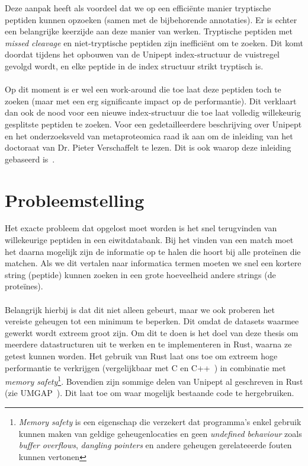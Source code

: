 \documentclass[11pt,dutch,faculty=we,layout=titlefont,underline=false,titleUppercase=true,titleUnderline=true]{ugent2016-report}
\begin{document}
    Deze aanpak heeft als voordeel dat we op een efficiënte manier tryptische peptiden kunnen opzoeken (samen met de bijbehorende annotaties).
    Er is echter een belangrijke keerzijde aan deze manier van werken.
    Tryptische peptiden met \textit{missed cleavage} en niet-tryptische peptiden zijn inefficiënt om te zoeken.
    Dit komt doordat tijdens het opbouwen van de Unipept index-structuur de vuistregel gevolgd wordt, en elke peptide in de index structuur strikt tryptisch is.
    \\ \\
    Op dit moment is er wel een work-around die toe laat deze peptiden toch te zoeken (maar met een erg significante impact op de performantie).
    Dit verklaart dan ook de nood voor een nieuwe index-structuur die toe laat volledig willekeurig gesplitste peptiden te zoeken.
    \newline
    Voor een gedetailleerdere beschrijving over Unipept en het onderzoeksveld van metaproteomica raad ik aan om de inleiding van het doctoraat van Dr. Pieter Verschaffelt te lezen.
    Dit is ook waarop deze inleiding gebaseerd is~\cite{phdPieterUnipept}.


    \section{Probleemstelling}\label{sec:probleemstelling}
    Het exacte probleem dat opgelost moet worden is het snel terugvinden van willekeurige peptiden in een eiwitdatabank.
    Bij het vinden van een match moet het daarna mogelijk zijn de informatie op te halen die hoort bij alle proteïnen die matchen.
    Als we dit vertalen naar informatica termen moeten we snel een kortere string (peptide) kunnen zoeken in een grote hoeveelheid andere strings (de proteïnes).
    \\ \\
    Belangrijk hierbij is dat dit niet alleen gebeurt, maar we ook proberen het vereiste geheugen tot een minimum te beperken.
    Dit omdat de datasets waarmee gewerkt wordt extreem groot zijn.
    Om dit te doen is het doel van deze thesis om meerdere datastructuren uit te werken en te implementeren in Rust, waarna ze getest kunnen worden.
    Het gebruik van Rust laat ons toe om extreem hoge performantie te verkrijgen (vergelijkbaar met C en C++~\cite{rustPerformantie}) in combinatie met \textit{memory safety}\footnote{\textit{Memory safety} is een eigenschap die verzekert dat programma's enkel gebruik kunnen maken van geldige geheugenlocaties en geen \textit{undefined behaviour} zoals \textit{buffer overflows}, \textit{dangling pointers} en andere geheugen gerelateeerde fouten kunnen vertonen}.
    Bovendien zijn sommige delen van Unipept al geschreven in Rust (zie UMGAP~\cite{UMGAP_paper, UMGAP_source}).
    Dit laat toe om waar mogelijk bestaande code te hergebruiken.
\end{document}

